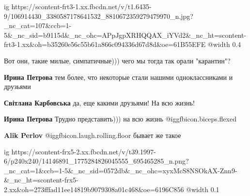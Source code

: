  
 
 
 
 

\ifcmt
  ig https://scontent-frt3-1.xx.fbcdn.net/v/t1.6435-9/106914430_3380587178641532_8810672359279479970_n.jpg?_nc_cat=107&ccb=1-5&_nc_sid=b9115d&_nc_ohc=APpJgpXRHQQAX_iYVd2&_nc_ht=scontent-frt3-1.xx&oh=b35260e56c55b61a866c094336d67d8d&oe=61B55EFE
  @width 0.4
\fi


Вот они, такие милые, симпатичные))) чего мы тогда так орали "карантин"?

\textbf{Ирина Петрова} тем более, что некоторые стали нашими одноклассниками и друзьями

\textbf{Світлана Карбовська} да, еще какими друзьями! На всю жизнь!

\textbf{Ирина Петрова} Трудно представить))) на всю жизнь  @igg{fbicon.biceps.flexed} 

\textbf{Alik Perlov}  @igg{fbicon.laugh.rolling.floor}  бывает же такое


\ifcmt
  ig https://scontent-frx5-2.xx.fbcdn.net/v/t39.1997-6/p240x240/14146891_1775284826045555_695465285_n.png?_nc_cat=1&ccb=1-5&_nc_sid=0572db&_nc_ohc=xyxMcS8NSOkAX-Znn9-&_nc_ht=scontent-frx5-2.xx&oh=273fffad11ee14819b9079308a01c468&oe=6196C856
  @width 0.1
\fi

